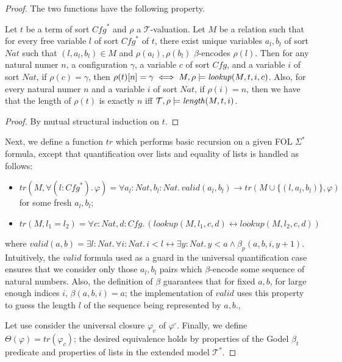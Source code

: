 \begin{proof}
The two functions have the following property.
\begin{lemma}
  Let $t$ be a term of sort $\mathit{Cfg}^*$ and $\rho$ a $\mathcal{T}$-valuation.
  Let $M$ be a relation such that for every free variable $l$ of sort $\mathit{Cfg}^*$ of $t$, there exist unique variables $a_l,b_l$ of sort $\mathit{Nat}$
  such that $(l,a_l,b_l) \in M$ and $\rho(a_l),\rho(b_l)$ $\beta$-encodes $\rho(l)$.
  Then for any natural numer $n$,
  a configuration $\gamma$, a variable $c$ of sort $\mathit{Cfg}$, and a variable $i$ of sort $\mathit{Nat}$,
  if $\rho(c) = \gamma$, then $\rho(t)[n] = \gamma \iff M,\rho \models \mathit{lookup}(M, t, i, c)$.
  Also, for every natural numer $n$ and a variable $i$ of sort $\mathit{Nat}$,
  if $\rho(i) = n$, then
  we have that the length of $\rho(t)$ is exactly $n$ iff $\mathcal{T}, \rho \models \mathit{length}(M, t, i)$.
\end{lemma}
\begin{proof}
By mutual structural induction on $t$.
\end{proof}

Next, we define a function $\mathit{tr}$ which performs basic recursion on a given FOL $\Sigma^*$ formula,
except that quantification over lists and equality of lists is handled as follows:
\begin{itemize}
    \item $\mathit{tr}(M, \forall (l : \mathit{Cfg}^*).\, \varphi) = \forall a_l : \mathit{Nat}, b_l : \mathit{Nat}.\, \mathit{valid}(a_l,b_l) \rightarrow \mathit{tr}(M \cup \{ (l, a_l, b_l) \}, \varphi)$
    for some fresh $a_l,b_l$;
    \item $\mathit{tr}(M, l_1 = l_2) = \forall c : \mathit{Nat}, d:\mathit{Cfg}.\, ( \mathit{lookup}(M, l_1, c, d) \leftrightarrow \mathit{lookup}(M, l_2, c, d))$
\end{itemize}
where $\mathit{valid}(a,b) = \exists l:\mathit{Nat}.\, \forall i:\mathit{Nat}.\, i < l \leftrightarrow \exists y:\mathit{Nat}.\, y < a \land \beta_p(a,b,i,y+1)$.
Intuitively, the $\mathit{valid}$ formula used as a guard in the universal quantification case ensures that we consider only those $a_l,b_l$ pairs
which $\beta$-encode some sequence of natural numbers.
Also, the definition of $\beta$ guarantees that for fixed $a,b$, for large enough indices $i$, $\beta(a,b,i) = a$;
the implementation of $\mathit{valid}$ uses this property to guess the length $l$ of the sequence being represented by $a,b$.,

Let use consider the universal closure $\varphi_c$ of $\varphi^\square$.
Finally, we define $\Theta(\varphi) = \mathit{tr}(\varphi_c)$; the desired equivalence holds by
properties of the Godel $\beta_t$ predicate and properties of lists in the extended model $\mathcal{T}^*$.

\end{proof}


